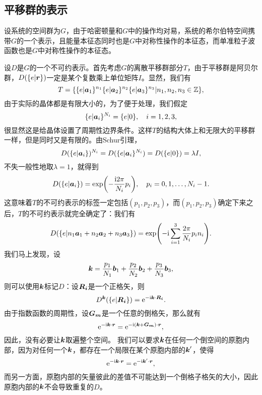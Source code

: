 
\subsection{平移群的表示}\label{sec:transition-group-rep}

设系统的空间群为$G$，由于哈密顿量和$G$中的操作均对易，系统的希尔伯特空间携带$G$的一个表示，且能量本征态同时也是$G$中对称性操作的本征态，而单准粒子波函数也是$G$中对称性操作的本征态。

设$D$是$G$的一个不可约表示。首先考虑$G$的离散平移群部分$T$，由于平移群是阿贝尔群，$D(\{ e | \vb*{r}\})$一定是某个复数乘上单位矩阵$I$。显然，我们有
\begin{equation}
    T = \{ \{e | \vb*{a}_1\}^{n_1} \{e | \vb*{a}_2\}^{n_2} \{e | \vb*{a}_3\}^{n_3} | n_1, n_2, n_3 \in \mathbb{Z} \},
\end{equation}
由于实际的晶体都是有限大小的，为了便于处理，我们假定
\begin{equation}
    \{e | \vb*{a}_i\}^{N_i} = \{e | 0\}, \quad i = 1, 2, 3,
\end{equation}
很显然这是给晶体设置了周期性边界条件。这样$T$的结构大体上和无限大的平移群一样，但是同时又是有限的。由Schur引理，
\[
    D(\{e | \vb*{a}_i \})^{N_i} = D(\{e | \vb*{a}_i \}^{N_i}) = D(\{e | 0\}) = \lambda I,
\]
不失一般性地取$\lambda = 1$，就得到
\begin{equation}
    D(\{e | \vb*{a}_i\}) = \exp(- \frac{\mathrm{i} 2 \pi}{N_i} p_i), \quad p_i = 0, 1, \ldots, N_i - 1.
\end{equation}
这意味着$T$的不可约表示的标签一定包括$(p_1, p_2, p_3)$，而$(p_1, p_2, p_3)$确定下来之后，$T$的不可约表示就完全确定了：我们有
\begin{equation}
    D(\{e | n_1 \vb*{a}_1 + n_2 \vb*{a}_2 + n_3 \vb*{a}_3\}) = \exp(- \mathrm{i} \sum_{i=1}^3 \frac{2\pi}{N_i} p_i n_i ).
\end{equation}
我们马上发现，设
\begin{equation}
    \vb*{k} = \frac{p_1}{N_1} \vb*{b}_1 + \frac{p_2}{N_2} \vb*{b}_2 + \frac{p_3}{N_3} \vb*{b}_3,
\end{equation}
则可以使用$\vb*{k}$标记$D$：设$\vb*{R}_{\vb*{i}}$是一个正格矢，则
\begin{equation}
    D^{\vb*{k}}(\{e | \vb*{R}_{\vb*{i}} \}) = \mathrm{e}^{- \mathrm{i} \vb*{k} \cdot \vb*{R}_{\vb*{i}}}.
\end{equation}
由于指数函数的周期性，设$\vb*{G}_{\vb*{m}}$是一个任意的倒格矢，那么就有
\[
    \mathrm{e}^{- \mathrm{i} \vb*{k} \cdot \vb*{r}} = \mathrm{e}^{- \mathrm{i} (\vb*{k} + \vb*{G}_{\vb*{m}}) \cdot \vb*{r}},
\]
因此，没有必要让$\vb*{k}$取遍整个空间。
我们可以要求$\vb*{k}$在任何一个倒空间的原胞内部，因为对任何一个$\vb*{k}$，都存在一个局限在某个原胞内部的$\vb*{k}'$，使得
\[
    \mathrm{e}^{- \mathrm{i} \vb*{k} \cdot \vb*{r}} = \mathrm{e}^{- \mathrm{i} \vb*{k}' \cdot \vb*{r}},
\]
而另一方面，原胞内部的矢量彼此的差值不可能达到一个倒格子格矢的大小，因此原胞内部的$\vb*{k}$不会导致重复的$D$。

